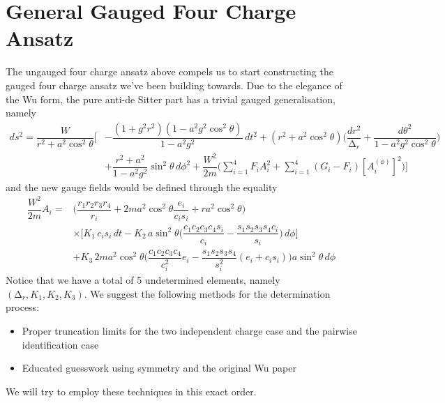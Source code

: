 \section{General Gauged Four Charge Ansatz}
The ungauged four charge ansatz above compels us to start constructing the gauged four charge ansatz we've been building towards. Due to the elegance of the Wu form, the pure anti-de Sitter part has a trivial gauged generalisation, namely
\[\begin{align*}
ds^2=\dfrac{W}{r^2+a^2\cos ^2\theta }\bigg[&-\dfrac{(1+g^2r^2)(1-a^2g^2\cos ^2\theta )}{1-a^2g^2}\,dt^2+(r^2+a^2\cos ^2\theta )\Big(\dfrac{dr^2}{\mathrm{\Delta}_{r}}+\dfrac{d\theta ^2}{1-a^2g^2\cos ^2\theta }\Big)\\&+\dfrac{r^2+a^2}{1-a^2g^2}\sin ^2\theta \,d\phi ^2+\dfrac{W^2}{2m}\Big(\sum ^{4}
_{i=1}F_{i}A_{i}^2+\sum ^{4}_{i=1}(G_{i}-F_{i})[A_{i}^{(\phi )}]^2\Big)\bigg]
\end{align*}\]
and the new gauge fields would be defined through the equality
\[\begin{align*}
\dfrac{W^2}{2m}A_{i}=&\Big(\dfrac{r_1r_2r_3r_4}{r_{i}}+2ma^2\cos ^2\theta \dfrac{e_{i}}{c_{i}s_{i}}+ra^2\cos ^2\theta \Big)\\&\times \Big[K_1\,c_{i}s_{i}\,dt-K_2\,a\sin^2 \theta \Big(\dfrac{c_1c_2c_3c_4s_{i}}{c_{i}}-\dfrac{s_1s_2s_3s_4c_{i}}{s_{i}}\Big)\,d\phi\Big]\\ &+K_3\,2ma^2\cos ^2\theta \Big(\dfrac{c_1c_2c_3c_4}{c_{i}^2}e_{i}-\dfrac{s_1s_2s_3s_4}{s_{i}^2}(e_{i}+c_{i}s_{i})\Big)a\sin ^2\theta \,d\phi 
\end{align*}\]
Notice that we have a total of 5 undetermined elements, namely $(\mathrm{\Delta }_{r},K_1,K_2,K_3)$. We suggest the following methods for the determination process:
\begin{itemize}
\item[(i)] Proper truncation limits for the two independent charge case and the pairwise identification case
\item[(ii)] Educated guesswork using symmetry and the original Wu paper
\end{itemize}
We will try to employ these techniques in this exact order. 
\vspace{2ex}
